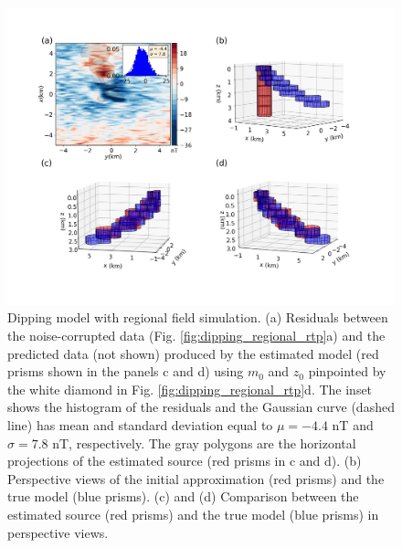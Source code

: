 \begin{figure}
    \centering
    \includegraphics[width=\linewidth]{figures/regional-l2-solution.png}
    \caption{Dipping model with regional field simulation. (a) Residuals between the  noise-corrupted data (Fig. \ref{fig:dipping_regional_rtp}a) and the predicted data (not shown) produced by the estimated model (red prisms shown in the panels c and d) using 
$m_0$  and $z_0$ pinpointed by the white diamond in Fig. \ref{fig:dipping_regional_rtp}d.
The inset shows the histogram of the residuals and the Gaussian curve (dashed line) has mean and standard deviation equal   to $\mu = -4.4$ nT and $\sigma=7.8$ nT, respectively. 
    The gray polygons are the horizontal projections of the estimated source (red prisms in c and d).
     (b) Perspective views of the initial approximation (red prisms) and the true model (blue prisms). 
     (c) and (d) Comparison between the estimated source (red prisms) and the true model (blue prisms) in perspective views.     
}
    \label{fig:regional-results}
\end{figure}


